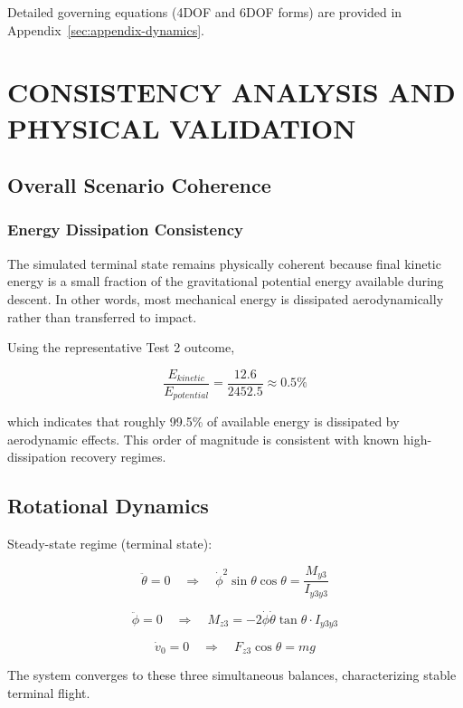 \documentclass[12pt,a4paper]{article}
\begin{document}
\vspace{0.5em}

Detailed governing equations (4DOF and 6DOF forms) are provided in Appendix~\ref{sec:appendix-dynamics}.

\vspace{0.5em}

\section{CONSISTENCY ANALYSIS AND PHYSICAL VALIDATION}
\label{sec:consistency-validation}

\subsection{Overall Scenario Coherence}

\subsubsection*{Energy Dissipation Consistency}

The simulated terminal state remains physically coherent because final kinetic energy is a small fraction of the gravitational potential energy available during descent. In other words, most mechanical energy is dissipated aerodynamically rather than transferred to impact.

Using the representative Test 2 outcome,

\[
\frac{E_{kinetic}}{E_{potential}} = \frac{12.6}{2452.5} \approx 0.5\%
\]

which indicates that roughly 99.5\% of available energy is dissipated by aerodynamic effects. This order of magnitude is consistent with known high-dissipation recovery regimes.

\subsection{Rotational Dynamics}

Steady-state regime (terminal state):

\[
\ddot{\theta} = 0 \quad \Rightarrow \quad \dot{\phi}^2 \sin\theta \cos\theta = \frac{M_{y3}}{I_{y3y3}}
\]

\[
\ddot{\phi} = 0 \quad \Rightarrow \quad M_{z3} = -2\dot{\phi}\dot{\theta}\tan\theta \cdot I_{y3y3}
\]

\[
\dot{v}_0 = 0 \quad \Rightarrow \quad F_{z3}\cos\theta = mg
\]

The system converges to these three simultaneous balances, characterizing stable terminal flight.
\end{document}
